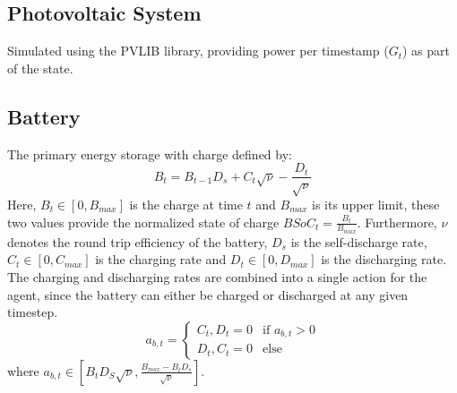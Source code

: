 \documentclass{article}
\theoremstyle{plain}
\theoremstyle{definition}
\theoremstyle{remark}
\begin{document}
\subsection{Photovoltaic System}
Simulated using the PVLIB library, providing power per timestamp ($G_t$) as part of the state.

\subsection{Battery}
The primary energy storage with charge defined by:
\begin{equation}
    B_t = B_{t-1} D_s+ C_t \sqrt{\nu} - \frac{D_t}{\sqrt{\nu}}
\end{equation}
Here, $B_t \in [0, B_{max}]$ is the charge at time $t$ and $B_{max}$ is its upper limit, these two values provide the normalized state of charge $BSoC_t = \frac{B_t}{B_{max}}$. Furthermore, $\nu$ denotes the round trip efficiency of the battery, $D_s$ is the self-discharge rate, $C_t \in [0, C_{max}]$ is the charging rate and $D_t  \in [0, D_{max}]$ is the discharging rate. The charging and discharging rates are combined into a single action for the agent, since the battery can either be charged or discharged at any given timestep. 
\begin{equation}
    a_{b, t} = \begin{cases}
            C_t, D_t = 0 & \text{if } a_{b, t} > 0 \\
            D_t, C_t = 0 & \text{else}
    \end{cases}
\end{equation}
where $a_{b, t} \in [B_t D_S \sqrt{\nu}, \frac{B_{max} - B_t D_s}{\sqrt{\nu}}]$.
\end{document}
